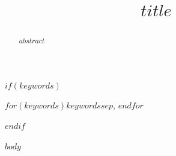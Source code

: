\documentclass[conference,compsoc]{IEEEtran}
\begin{document}
\title{$title$}
\author{}
\maketitle
\begin{abstract}
$abstract$
\end{abstract}
$if(keywords)$
\begin{IEEEkeywords}
$for(keywords)$$keywords$$sep$, $endfor$
\end{IEEEkeywords}
$endif$

$body$
\end{document}
